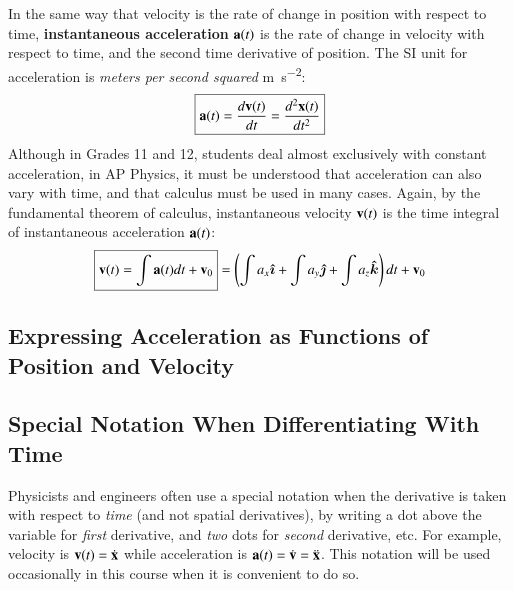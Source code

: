 \documentclass[11pt]{article}
\newcommand{\mb}[1]{\ensuremath\mathbf{#1}}
\begin{document}
In the same way that velocity is the rate of change in position with respect
to time, \textbf{instantaneous acceleration} $\mb{a}(t)$ is the rate of change
in velocity with respect to time, and the second time derivative of position.
The SI unit for acceleration is \emph{meters per second squared}
\si{\metre\per\second^2}:
\begin{equation}
  \boxed{\mb{a}(t)= \frac{d\mb{v}(t)}{dt}=\frac{d^2\mb{x}(t)}{dt^2}}
\end{equation}
Although in Grades 11 and 12, students deal almost exclusively with constant
acceleration, in AP Physics, it must be understood that acceleration can also
vary with time, and that calculus must be used in many cases.
Again, by the fundamental theorem of calculus, instantaneous velocity
$\mb{v}(t)$ is the time integral of instantaneous acceleration $\mb{a}(t)$:
\begin{equation}
  \boxed{\mb{v}(t)=\int\mb{a}(t)dt+\mb{v}_0}
  =
    \left(\int a_x\bm{\hat{\imath}} +
    \int a_y\bm{\hat{\jmath}} +
    \int a_z\bm{\hat{k}}\right) dt +\mb{v}_0
\end{equation}

\subsection{Expressing Acceleration as Functions of Position and Velocity}

\subsection{Special Notation When Differentiating With Time}

Physicists and engineers often use a special notation when the derivative is
taken with respect to \emph{time} (and not spatial derivatives), by writing a
dot above the variable for \emph{first} derivative, and \emph{two} dots for
\emph{second} derivative, etc. For example, velocity is
$\mb{v}(t)=\dot{\mb{x}}$ while acceleration is
$\mb{a}(t)= \dot{\mb{v}}=\ddot{\mb{x}}$. This notation will be used occasionally
in this course when it is convenient to do so.
\end{document}
